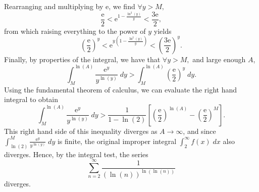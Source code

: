 \documentclass[
  10pt,
  a4paper]{article}
\theoremstyle{plain}
\theoremstyle{definition}
\theoremstyle{plain}
\theoremstyle{plain}
\theoremstyle{plain}
\theoremstyle{plain}
\theoremstyle{definition}
\theoremstyle{definition}
\theoremstyle{remark}
\theoremstyle{remark}
\begin{document}
Rearranging and multiplying by \(\mathrm{e}\), we find \(\forall y > M,\) \[\frac{\mathrm{e}}{2} < \mathrm{e}^{1 - \frac{\ln^2(y)}{y}} < \frac{3\mathrm{e}}{2},\] from which raising everything to the power of \(y\) yields \[\left(\frac{\mathrm{e}}{2}\right)^y < \mathrm{e}^{y\left(1 - \frac{\ln^2(y)}{y}\right)} < \left(\frac{3\mathrm{e}}{2}\right)^y.\] Finally, by properties of the integral, we have that \(\forall y > M,\) and large enough \(A\), \[\int_{M}^{\ln(A)}\frac{\mathrm{e}^y}{y^{\ln(y)}}\;dy > \int_M^{\ln(A)}\left(\frac{\mathrm{e}}{2}\right)^y\;dy.\] Using the fundamental theorem of calculus, we can evaluate the right hand integral to obtain \[\int_{M}^{\ln(A)}\frac{\mathrm{e}^y}{y^{\ln(y)}}\;dy > \frac{1}{1 - \ln(2)}\left[\left(\frac{\mathrm{e}}{2}\right)^{\ln(A)} - \left(\frac{\mathrm{e}}{2}\right)^{M} \right].\] This right hand side of this inequality diverges as \(A \to \infty\), and since \(\int_{\ln(2)}^M \frac{\mathrm{e}^y}{y^{\ln(y)}}\;dy\) is finite, the original improper integral \(\int_{2}^{\infty} f(x)\;dx\) also diverges. Hence, by the integral test, the series \[\sum_{n=2}^{\infty}\frac{1}{(\ln(n))^{\ln(\ln(n))}}\] diverges.
\end{document}

